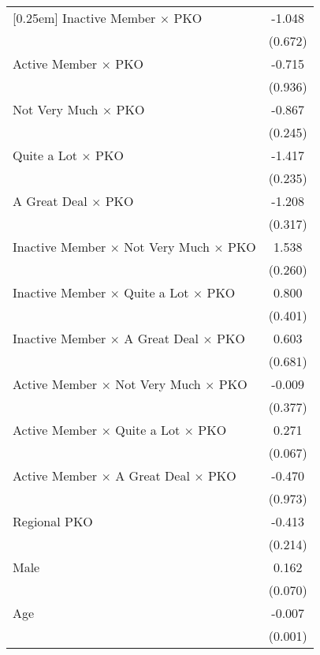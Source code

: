 \begin{table}[htbp]
\begin{tabular}{l*{1}{c}}
[0.25em]
Inactive Member $\times$ PKO&      -1.048        \\
                    &     (0.672)        \\
[0.25em]
Active Member $\times$ PKO&      -0.715        \\
                    &     (0.936)        \\
[0.25em]
Not Very Much $\times$ PKO&      -0.867\sym{**}\\
                    &     (0.245)        \\
[0.25em]
Quite a Lot $\times$ PKO&      -1.417\sym{**}\\
                    &     (0.235)        \\
[0.25em]
A Great Deal $\times$ PKO&      -1.208\sym{**}\\
                    &     (0.317)        \\
[0.25em]
Inactive Member $\times$ Not Very Much $\times$ PKO&       1.538\sym{**}\\
                    &     (0.260)        \\
[0.25em]
Inactive Member $\times$ Quite a Lot $\times$ PKO&       0.800\sym{*} \\
                    &     (0.401)        \\
[0.25em]
Inactive Member $\times$ A Great Deal $\times$ PKO&       0.603        \\
                    &     (0.681)        \\
[0.25em]
Active Member $\times$ Not Very Much $\times$ PKO&      -0.009        \\
                    &     (0.377)        \\
[0.25em]
Active Member $\times$ Quite a Lot $\times$ PKO&       0.271\sym{**}\\
                    &     (0.067)        \\
[0.25em]
Active Member $\times$ A Great Deal $\times$ PKO&      -0.470        \\
                    &     (0.973)        \\
[0.25em]
Regional PKO&      -0.413\sym{+} \\
                    &     (0.214)        \\
[0.25em]
Male                &       0.162\sym{*} \\
                    &     (0.070)        \\
[0.25em]
Age                 &      -0.007\sym{**}\\
                    &     (0.001)        \\

\end{tabular}
\end{table}
